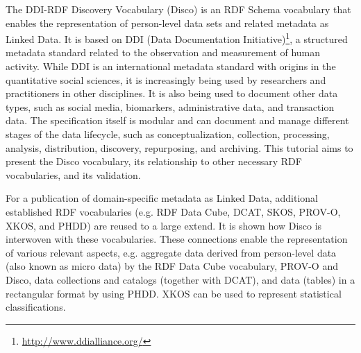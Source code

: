 \documentclass{llncs}
\begin{document}
The DDI-RDF Discovery Vocabulary (Disco)\cite{Bosch2012,Bosch2013} is an RDF Schema vocabulary that enables the representation of person-level data sets and related metadata as Linked Data.
It is based on DDI (Data Documentation Initiative)\footnote{\url{http://www.ddialliance.org/}}, a structured metadata standard related to the observation and measurement of human activity.
While DDI is an international metadata standard with origins in the quantitative social sciences, it is increasingly being used by researchers and practitioners in other disciplines. It is also being used to document other data types, such as social media, biomarkers, administrative data, and transaction data. The specification itself is modular and can document and manage different stages of the data lifecycle, such as conceptualization, collection, processing, analysis, distribution, discovery, repurposing, and archiving.
This tutorial aims to present the Disco vocabulary, its relationship to other necessary RDF vocabularies, and its validation.
 
For a publication of domain-specific metadata as Linked Data, additional established RDF vocabularies (e.g. RDF Data Cube, DCAT, SKOS, PROV-O, XKOS, and PHDD) are reused to a large extend. It is shown how Disco is interwoven with these vocabularies. 
These connections enable the representation of various relevant aspects, e.g. aggregate data derived from person-level data (also known as micro data) by the RDF Data Cube vocabulary, PROV-O and Disco, data collections and catalogs (together with DCAT), and data (tables) in a rectangular format by using PHDD. XKOS can be used to represent statistical classifications.
\end{document}
